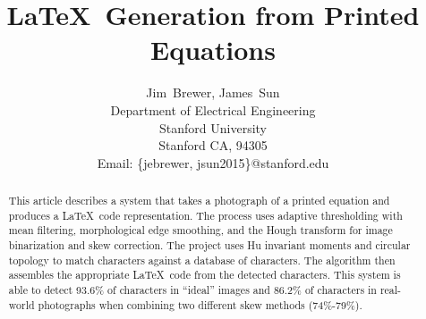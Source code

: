 \documentclass[journal]{IEEEtran}
\begin{document}
%
\title{\LaTeX\ Generation from Printed Equations}
%
%
%

\author{Jim~Brewer, James~Sun
        \\
        Department of Electrical Engineering\\
        Stanford University\\
        Stanford CA, 94305\\
        Email: \{jebrewer, jsun2015\}@stanford.edu}


\maketitle

\begin{abstract}
This article describes a system that takes a photograph of a printed equation and produces a \LaTeX\ code representation. The process uses adaptive thresholding with mean filtering, morphological edge smoothing, and the Hough transform for image binarization and skew correction. The project uses Hu invariant moments and circular topology to match characters against a database of characters. The algorithm then assembles the appropriate \LaTeX\ code from the detected characters. This system is able to detect 93.6\% of characters in “ideal” images and 86.2\% of characters in real-world photographs when combining two different skew methods (74\%-79\%).
\end{abstract}
\end{document}

